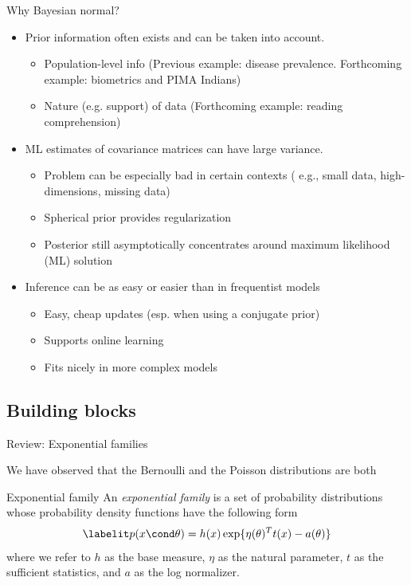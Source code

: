 \documentclass[10pt]{beamer}
\begin{document}
\begin{frame}{Why \alert{Bayesian} normal? }
\begin{itemize}
\item Prior information often exists and can be taken into account.
	\begin{itemize}
	\item Population-level info {\tiny (Previous example: disease prevalence.  Forthcoming example: biometrics and PIMA Indians)}
	\item Nature (e.g. support) of data {\tiny (Forthcoming example: reading comprehension)}
	\end{itemize} \pause 	
\item ML estimates of covariance matrices can have large variance.
	\begin{itemize}  
	\item Problem can be especially bad in certain contexts {\tiny ( e.g., small data, high-dimensions, missing data)}
	\item Spherical prior provides regularization
	\item Posterior still asymptotically concentrates around maximum likelihood (ML) solution
	\end{itemize} \pause 
\item Inference can be as easy or easier than in frequentist models
	\begin{itemize}
	\item Easy, cheap updates {\scriptsize (esp. when using a conjugate prior)}
	\item Supports online learning 	
	\item Fits nicely in more complex models	
	\end{itemize}
\end{itemize}	
\end{frame}

\subsection{Building blocks}
\begin{frame}{Review: Exponential families}

We have observed that the Bernoulli and the Poisson distributions are both 
 
\begin{block}{Exponential family}
An \textit{exponential family} is a set of probability distributions whose probability density functions have the following form
\begin{align*}
\labelit \label{eqn:exponential_family}
 p(x \cond \theta) = h(x) \exp \{ \eta(\theta)^T t(x) - a(\theta)\} 
\end{align*}
where we refer to $h$ as the base measure, $\eta$ as the natural parameter, $t$ as the sufficient statistics, and $a$ as the log normalizer. 
\end{block}
\end{frame}
\end{document}
